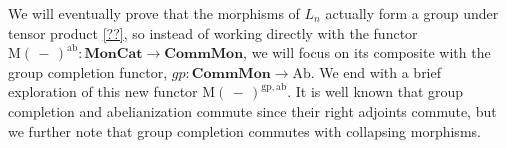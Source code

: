 \documentclass{amsbook} %
\newcommand{\mb}{\mathbf}
\newcommand{\mon}{\ensuremath{\mb{Mon}}}
\newcommand{\cmon}{\ensuremath{\mb{CommMon}}}
\newcommand{\moncat}{\ensuremath{\mb{MonCat}}}
\numberwithin{section}{chapter}
\begin{document}

 We will eventually prove that the morphisms of $L_n$ actually form a group under tensor product \cref{??}, so instead of working directly with the functor $\mathrm{M}(\, - \,)^{\mathrm{ab}}: \moncat \to \cmon$, we will focus on its composite with the group completion functor, $gp : \cmon \to \mathrm{Ab}$. We end with a brief exploration of this new functor $\mathrm{M}(\, - \,)^{\mathrm{gp},\mathrm{ab}}$. 
It is well known that group completion and abelianization commute since their right adjoints commute, but we further note that group completion commutes with collapsing morphisms.
\end{document}
